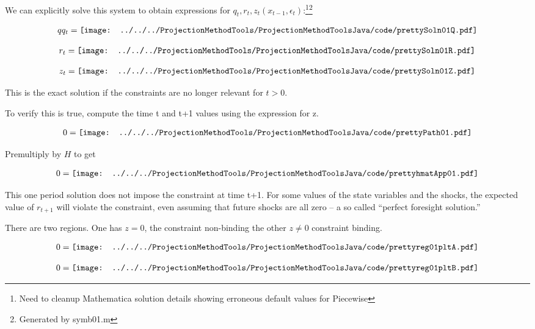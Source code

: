 We can explicitly solve this system to obtain  expressions for $q_t, r_t, z_{t}(x_{t-1},\epsilon_t) $:\footnote{Need to cleanup Mathematica solution details showing erroneous default values for Piecewise}\footnote{Generated by symb01.m}

\begin{gather*}
  qq_t=\vcenter{\hbox{\texttt{[image: ../../../ProjectionMethodTools/ProjectionMethodToolsJava/code/prettySoln01Q.pdf]}}}
\end{gather*}

\begin{gather*}
  r_t=\vcenter{\hbox{\texttt{[image: ../../../ProjectionMethodTools/ProjectionMethodToolsJava/code/prettySoln01R.pdf]}}}
\end{gather*}

\begin{gather*}
  z_t=\vcenter{\hbox{\texttt{[image: ../../../ProjectionMethodTools/ProjectionMethodToolsJava/code/prettySoln01Z.pdf]}}}
\end{gather*}

This is the exact solution if the constraints are no longer relevant for 
$t >0$.

To verify this is true, compute the time t and t+1 values using the expression for z.

\begin{gather*}
  0=\vcenter{\hbox{\texttt{[image: ../../../ProjectionMethodTools/ProjectionMethodToolsJava/code/prettyPath01.pdf]}}}
\end{gather*}

Premultiply by $H$ to get

\begin{gather*}
  0=\vcenter{\hbox{\texttt{[image: ../../../ProjectionMethodTools/ProjectionMethodToolsJava/code/prettyhmatApp01.pdf]}}}
\end{gather*}


This one period solution does not impose the constraint at time t+1.  For some values of the state variables and the shocks, the expected value 
of $r_{t+1}$ will violate the constraint, even assuming that future shocks are all zero -- a so called ``perfect foresight solution.''


There are two regions.  One has $z=0$, the constraint non-binding the other 
$z\ne 0$ constraint binding.


\begin{gather*}
  0=\vcenter{\hbox{\texttt{[image: ../../../ProjectionMethodTools/ProjectionMethodToolsJava/code/prettyreg01pltA.pdf]}}}
\end{gather*}


\begin{gather*}
  0=\vcenter{\hbox{\texttt{[image: ../../../ProjectionMethodTools/ProjectionMethodToolsJava/code/prettyreg01pltB.pdf]}}}
\end{gather*}


